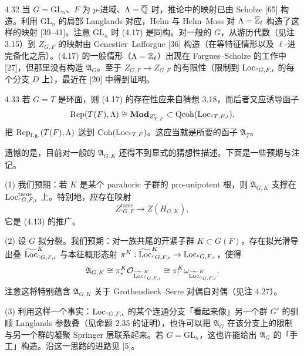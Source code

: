 \begin{rem}{4.32}\label{thm:a2-4-32}
当 $G=\mathrm{GL}_n$、$F$ 为 $p$-进域、$\Lambda=\overline{\mathbb{Q}}$ 时，推论中的映射已由 Scholze [65] 构造。利用 $\mathrm{GL}_n$ 的局部 Langlands 对应，Helm 与 Helm–Moss 对 $\Lambda=\overline{\mathbb{Z}}_\ell$ 构造了这样的映射 [39–41]。注意 $\mathrm{GL}_n$ 时 (4.17) 是同构。对一般的 $G$，从游历代数（见注 3.15）到 $Z_{G,F}$ 的映射由 Genestier–Lafforgue [36] 构造（在等特征情形以及 $\ell$-进完备化之后）。(4.17) 的一般情形（$\Lambda=\mathbb{Z}_\ell$）出现在 Fargues–Scholze 的工作中 [27]，但那里没有构造 $\mathfrak A_G$。至于 $Z_{G,F}\to Z_{G,F}$ 的有限性（限制到 $\operatorname{Loc}_{{}^{c}G,F,\iota}$ 的每个分支 $D$ 上），最近在 [20] 中得到证明。
\end{rem}

\begin{rem}{4.33}\label{thm:a2-4-33}
若 $G=T$ 是环面，则 (4.17) 的存在性应来自猜想 3.18，而后者又应诱导函子
\[
\operatorname{Rep}(T(F),\Lambda)\cong\mathbf{Mod}_{Z^{c}_{T,F}}\subset\operatorname{Qcoh}(\operatorname{Loc}_{{}^{c}T,F,\iota}),
\]
把 $\operatorname{Rep}_{\mathrm{f.g.}}(T(F),\Lambda)$ 送到 $\operatorname{Coh}(\operatorname{Loc}_{{}^{c}T,F})$。这应当就是所要的函子 $\mathfrak A_T$。
\end{rem}

遗憾的是，目前对一般的 $\mathfrak A_{G,K}$ 还得不到显式的猜想性描述。下面是一些预期与注记。

(1) 我们预期：若 $K$ 是某个 parahoric 子群的 pro-unipotent 根，则 $\mathfrak A_{G,K}$ 支撑在 $\operatorname{Loc}^{\mathrm{tame}}_{{}^{c}G,F,\iota}$ 上。特别地，应存在映射
\begin{equation}
Z^{\mathrm{tame}}_{{}^{c}G,F}\to Z(H_{G,K}), \tag{4.18}\label{eq:a2-4-18}
\end{equation}
它是 (4.13) 的推广。

(2) 设 $G$ 拟分裂。我们预期：对一族共尾的开紧子群 $K\subset G(F)$，存在拟光滑导出叠 $\widetilde{\operatorname{Loc}}^{K}_{{}^{c}G,F,\iota}$ 与本征概形态射 $\pi^K:\widetilde{\operatorname{Loc}}^{K}_{{}^{c}G,F,\iota}\to\operatorname{Loc}_{{}^{c}G,F,\iota}$，使得
\[
\mathfrak A_{G,K}\cong\pi^K_*\mathcal O_{\widetilde{\operatorname{Loc}}^{K}_{{}^{c}G,F,\iota}}\cong\pi^K_!\omega_{\widetilde{\operatorname{Loc}}^{K}_{{}^{c}G,F,\iota}}.
\]
注意这将特别蕴含 $\mathfrak A_{G,K}$ 关于 Grothendieck–Serre 对偶自对偶（见注 4.27）。

(3) 利用这样一个事实：$\operatorname{Loc}_{{}^{c}G,F,\iota}$ 的某个连通分支「看起来像」另一个群 $G'$ 的驯顺 Langlands 参数叠（见命题 2.35 的证明），也许可以把 $\mathfrak A_G$ 在该分支上的限制与另一个群的凝聚 Springer 层联系起来。若 $G=\mathrm{GL}_n$，这也许能给出 $\mathfrak A_G$ 的「手工」构造。沿这一思路的进路见 [5]。

